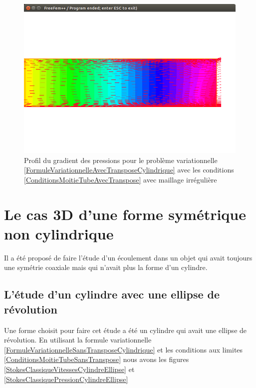 \documentclass[11pt,a4paper]{article}
\numberwithin{equation}{subsection}
\numberwithin{figure}{subsection}
\begin{document}
\begin{figure}
\centering
\includegraphics[scale=0.4]{StokesLimitesPressionCylindriqueIrregulier.png}
\caption{Profil du gradient des pressions pour le problème variationnelle \ref{FormuleVariationnelleAvecTransposeCylindrique} avec les conditions \ref{ConditionsMoitieTubeAvecTranspose} avec maillage irrégulière}
\label{StokesLimitesPressionCylindriqueIrregulier}
\end{figure}

%
%
\section{Le cas 3D d'une forme symétrique non cylindrique}

Il a été proposé de faire l'étude d'un écoulement dans un objet qui avait toujours une symétrie coaxiale mais qui n'avait plus la forme d'un cylindre. 

\subsection{L'étude d'un cylindre avec une ellipse de révolution}

Une forme choisit pour faire cet étude a été un cylindre qui avait une ellipse de révolution. En utilisant la formule variationnelle \ref{FormuleVariationnelleSansTransposeCylindrique} et les conditions aux limites \ref{ConditionsMoitieTubeSansTranspose} nous avons les figures \ref{StokesClassiqueVitessesCylindreEllipse} et \ref{StokesClassiquePressionCylindreEllipse}
\end{document}
